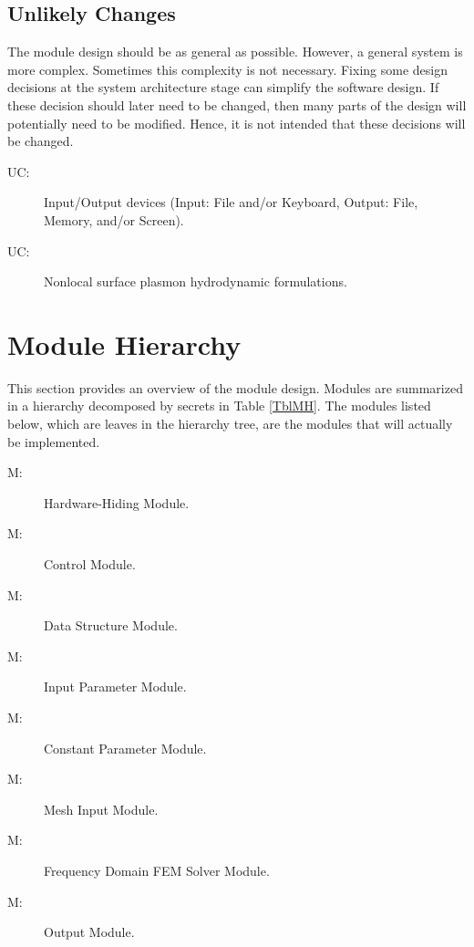 \documentclass[12pt, titlepage]{article}
\newcounter{ucnum} \newcommand{\uctheucnum}{UC\theucnum}
\newcounter{mnum} \newcommand{\mthemnum}{M\themnum}
\begin{document}
	\subsection{Unlikely Changes} \label{SecUchange}
	
	The module design should be as general as possible. However, a general system
	is more complex. Sometimes this complexity is not necessary. Fixing some design
	decisions at the system architecture stage can simplify the software design. If
	these decision should later need to be changed, then many parts of the design
	will potentially need to be modified. Hence, it is not intended that these
	decisions will be changed.
	
	\begin{description} \item[ \uctheucnum \label{ucIO}:]
		Input/Output devices (Input: File and/or Keyboard, Output: File, Memory, and/or
		Screen). \item[ \uctheucnum \label{ucForm}:] Nonlocal
		surface plasmon hydrodynamic formulations. \end{description}
	
	
	\section{Module Hierarchy} \label{SecMH}
	
	This section provides an overview of the module design. Modules are summarized
	in a hierarchy decomposed by secrets in Table \ref{TblMH}. The modules listed
	below, which are leaves in the hierarchy tree, are the modules that will
	actually be implemented.
	
	\begin{description} \item [ \mthemnum \label{mHH}:]
		Hardware-Hiding Module.
		
		\item [ \mthemnum \label{mSC}:] \progname{} Control
		Module.
		
		\item [ \mthemnum \label{mDS}:] Data Structure Module.
		
		\item [ \mthemnum \label{mIP}:] Input Parameter Module.
		
		\item [ \mthemnum \label{mCP}:] Constant Parameter
		Module.
		
		\item [ \mthemnum \label{mMI}:] Mesh Input Module.
		
		\item [ \mthemnum \label{mFD}:] Frequency Domain FEM
		Solver Module.
		
		\item [ \mthemnum \label{mOut}:] Output Module.
		
	\end{description}
	
\end{document}
